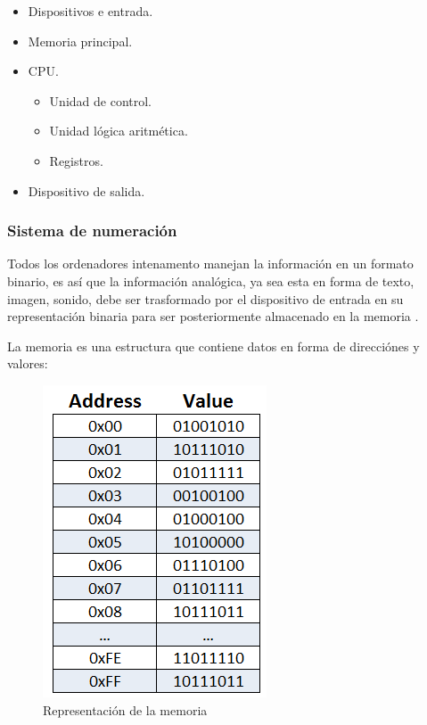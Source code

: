 \documentclass[a4paper,12pt,spanish]{article}
\begin{document}
\begin{itemize}
\item Dispositivos e entrada.
\item Memoria principal.
\item CPU.
  \begin{itemize}
  \item Unidad de control.
  \item Unidad lógica aritmética.
  \item Registros.
  \end{itemize}
\item Dispositivo de salida.
\end{itemize}



\subsubsection{Sistema de numeración}
\label{sec:sisnum}

Todos los ordenadores intenamento manejan la información en un formato binario, es así que la información analógica, ya sea esta en forma de texto, imagen, sonido, debe ser trasformado por el dispositivo de entrada en su representación binaria para ser posteriormente almacenado en la memoria \cite{Francis2020}.

La memoria es una estructura que contiene datos en forma de direcciónes y valores:

\begin{figure}[H]
  \centering
  \includegraphics[scale=0.7]{memoria}
  \caption{Representación de la memoria}
  \label{fig:memoria}
\end{figure}
\end{document}
